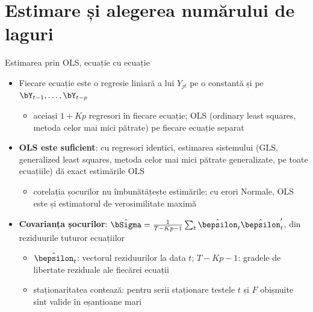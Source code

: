 \section{Estimare și alegerea numărului de laguri}

\begin{frame}{Estimarea prin OLS, ecuație cu ecuație}
\itemsize{\small}
\begin{itemize}
    \item Fiecare ecuație este o regresie liniară a lui $Y_{jt}$ pe o constantă și pe $\bY_{t-1}, \dots, \bY_{t-p}$
    \begin{itemize}
        \item aceiași $1 + Kp$ regresori în fiecare ecuație; OLS (ordinary least squares, metoda celor mai mici pătrate) pe fiecare ecuație separat
    \end{itemize}
    \item \textbf{OLS este suficient}: cu regresori identici, estimarea sistemului (GLS, generalized least squares, metoda celor mai mici pătrate generalizate, pe toate ecuațiile) dă exact estimările OLS
    \begin{itemize}
        \item corelația șocurilor nu îmbunătățește estimările; cu erori Normale, OLS este și estimatorul de verosimilitate maximă
    \end{itemize}
    \item \textbf{Covarianța șocurilor}: $\hat\bSigma = \frac{1}{T - Kp - 1}\sum_t\hat\bepsilon_t\hat\bepsilon_t'$, din reziduurile tuturor ecuațiilor
    \begin{itemize}
        \item $\hat\bepsilon_t$: vectorul reziduurilor la data $t$; $T - Kp - 1$: gradele de libertate reziduale ale fiecărei ecuații
        \item staționaritatea contează: pentru serii staționare testele $t$ și $F$ obișnuite sînt valide în eșantioane mari
    \end{itemize}
\end{itemize}
\end{frame}

